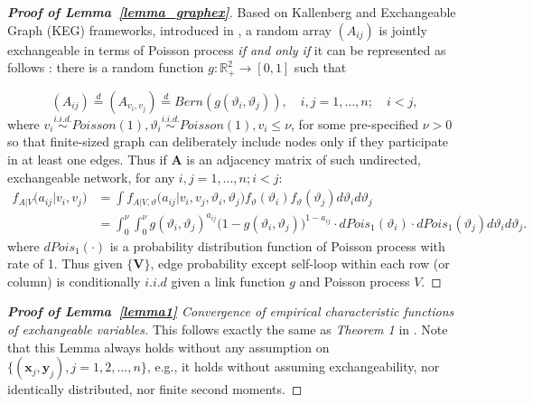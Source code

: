 \documentclass[12pt]{article}
\theoremstyle{definition}
\begin{document}
\begin{proof}[\textbf{Proof of Lemma~\ref{lemma_graphex}}]
	Based on Kallenberg and Exchangeable Graph (KEG) frameworks, introduced in \cite{veitch2015class}, a random array $(A_{ij})$ is jointly exchangeable in terms of Poisson process \textit{if and only if} it can be represented as follows : there is a random function $g : \mathbb{R}^{2}_{+} \rightarrow [0,1]$ such that 
	
	\begin{equation}
	(A_{ij})  \stackrel{d}{=} (A_{v_{i}, v_{j}} )  \stackrel{d}{=} Bern( g( \vartheta_{i}, \vartheta_{j})), \quad i,j=1,\ldots,n ;\quad i < j,
	\end{equation}
	where $v_{i} \overset{i.i.d.}{\sim} Poisson(1), \vartheta_{i} \overset{i.i.d.}{\sim} Poisson(1), v_{i} \leq \nu$, for some pre-specified $\nu >0$ so that finite-sized graph can deliberately include nodes only if they participate in at least one edges. Thus if $\mathbf{A}$ is an adjacency matrix of such undirected, exchangeable network, for any $i,j = 1,... , n; i < j$:
\begin{equation}
\begin{split}
	f_{A | V} \big( a_{ij} \big| v_{i}, v_{j} \big) & = \int f_{A | V, \vartheta} \big( a_{ij} \big| v_{i}, v_{j}, \vartheta_{i}, \vartheta_{j} \big) f_{\vartheta} ( \vartheta_{i}) f_{\vartheta}(\vartheta_{j})   d\vartheta_{i} d\vartheta_{j}   \\ & = \int_{0}^{\nu} \int_{0}^{\nu}   g( \vartheta_{i},  \vartheta_{j})^{a_{ij}} \big( 1- g( \vartheta_{i},  \vartheta_{j}) \big)^{1-a_{ij}}  \cdot dPois_{1}(\vartheta_{i}) \cdot dPois_{1}(\vartheta_{j})  d \vartheta_{i} d \vartheta_{j}.
\end{split}
\end{equation}
where $dPois_{1}(\cdot)$ is a probability distribution function of Poisson process with rate of 1.  Thus given $\{ \mathbf{V} \}$, edge probability except self-loop within each row (or column) is conditionally $\textit{i.i.d}$ given a link function $g$ and Poisson process $V$.
\end{proof}
\begin{proof}[\textbf{Proof of Lemma~\ref{lemma1}} Convergence of empirical characteristic functions of exchangeable variables] 
	
This follows exactly the same as \textit{Theorem 1} in \cite{szekely2007measuring}. Note that this Lemma always holds without any assumption on $\{(\mathbf{x}_{j},\mathbf{y}_{j}), j=1,2,...,n\}$, e.g., it holds without assuming exchangeability, nor identically distributed, nor finite second moments.
\end{proof}
\end{document}
